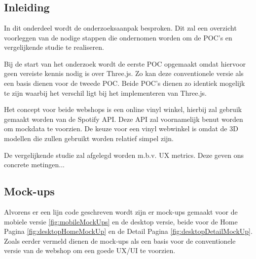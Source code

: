 
\chapter{}%
\label{ch:methodologie}

\section{Inleiding}

In dit onderdeel wordt de onderzoeksaanpak besproken. Dit zal een overzicht voorleggen van de  nodige stappen die ondernomen worden om de POC's en vergelijkende studie te realiseren.

Bij de start van het onderzoek wordt de eerste POC opgemaakt omdat hiervoor geen vereiste kennis nodig is over Three.js. Zo kan deze conventionele versie als een basis dienen voor de tweede POC. Beide POC's dienen zo identiek mogelijk te zijn waarbij het verschil ligt bij het implementeren van Three.js.

Het concept voor beide webshops is een online vinyl winkel, hierbij zal gebruik gemaakt worden van de Spotify API. Deze API zal voornamelijk benut worden om mockdata te voorzien. De keuze voor een vinyl webwinkel is omdat de 3D modellen die zullen gebruikt worden relatief simpel zijn.

De vergelijkende studie zal afgelegd worden m.b.v. UX metrics. Deze geven ons concrete metingen...

\section{Mock-ups}

Alvorens er een lijn code geschreven wordt zijn er mock-ups gemaakt voor de mobiele versie \ref{fig:mobileMockUps} en de desktop versie, beide voor de Home Pagina \ref{fig:desktopHomeMockUp} en de Detail Pagina \ref{fig:desktopDetailMockUp}. Zoals eerder vermeld dienen de mock-ups als een basis voor de conventionele versie van de webshop om een goede UX/UI te voorzien.

